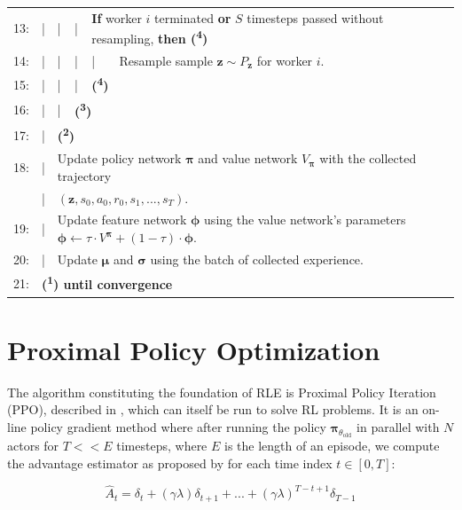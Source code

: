 {\begin{table}[h!]
\begin{tabular}{rlllll}
    13: & | & | & | & \multicolumn{2}{l}{\textbf{If} worker $i$ terminated \textbf{or} $S$ timesteps passed without resampling, \textbf{then (\textsuperscript{4})}}\\
    14: & | & | & | & | & Resample sample $\textbf{z} \sim P_{\textbf{z}}$ for worker $i$.\\
    15: & | & | & | & \multicolumn{2}{l}{\textbf{(\textsuperscript{4})}}\\
    16: & | & | & \multicolumn{3}{l}{\textbf{(\textsuperscript{3})}}\\
    17: & | & \multicolumn{4}{l}{\textbf{(\textsuperscript{2})}}\\
    18: & | & \multicolumn{4}{l}{Update policy network $\boldsymbol{\pi}$ and value network $V_{\boldsymbol{\pi}}$ with the collected trajectory}\\
    & | & \multicolumn{4}{l}{$(\textbf{z}, s_{0}, a_{0}, r_{0}, s_{1}, ..., s_{T})$.}\\
    19: & | & \multicolumn{4}{l}{Update feature network $\boldsymbol{\phi}$ using the value network's parameters $\boldsymbol{\phi} \leftarrow \tau \cdot V^{\boldsymbol{\pi}} + (1 - \tau) \cdot \boldsymbol{\phi}$.}\\
    20: & | & \multicolumn{4}{l}{Update $\boldsymbol{\mu}$ and $\boldsymbol{\sigma}$ using the batch of collected experience.}\\
    21: & \multicolumn{5}{l}{\textbf{(\textsuperscript{1}) until convergence}}\\
    \hline\hline
  \end{tabular}
\end{table}}

\clearpage
\hypertarget{algo-ppo}{\section{Proximal Policy Optimization}}

\noindent The algorithm constituting the foundation of RLE is Proximal Policy Iteration (PPO), described in \cite{ppo-paper}, which can itself be run to solve RL problems. It is an on-line policy gradient method where after running the policy $\boldsymbol{\pi}_{\theta_{\text{old}}}$ in parallel with $N$ actors for $T << E$ timesteps, where $E$ is the length of an episode, we compute the advantage estimator as proposed by \cite{generalized-advantage-estimation-paper} for each time index $t \in [0, T]$:

\begin{equation}
  \hat{A}_{t} = \delta_{t} + \left(\gamma \lambda\right) \delta_{t+1} + ... + \left(\gamma \lambda\right)^{T-t+1} \delta_{T - 1}
  \label{eq:ppo-advantage-estimator}
\end{equation}

